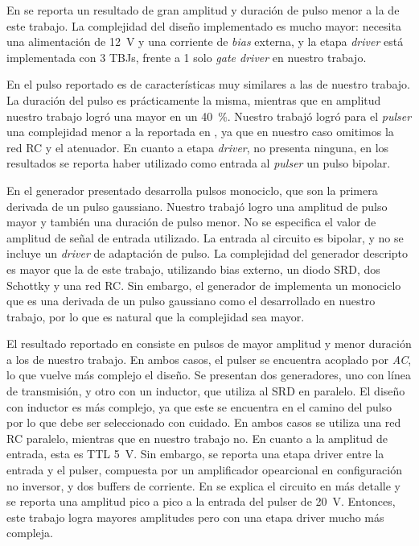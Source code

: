 En \cite{protiva2009} se reporta un resultado de gran amplitud y duración de
pulso menor a la de este trabajo. La complejidad del diseño implementado es
mucho mayor: necesita una alimentación de \qty{12}{\volt} y
una corriente de \textit{bias} externa, y la etapa \textit{driver} está
implementada con 3 TBJs, frente a 1 solo \textit{gate driver} en nuestro
trabajo.

En \cite{kamal2014} el pulso reportado es de características muy similares a las
de nuestro trabajo.  La duración del pulso es prácticamente la misma, mientras
que en amplitud nuestro trabajo logró una mayor en un \qty{40}{\percent}.
Nuestro trabajó logró para el \textit{pulser} una complejidad menor a la
reportada en \cite{kamal2014}, ya que en nuestro caso omitimos la red RC y el
atenuador. En cuanto a etapa \textit{driver}, \cite{kamal2014} no presenta
ninguna, en los resultados se reporta haber utilizado como entrada al
\textit{pulser} un pulso bipolar.

En \cite{han2002} el generador presentado desarrolla pulsos monociclo, que son
la primera derivada de un pulso gaussiano. Nuestro trabajó logro una amplitud de
pulso mayor y también una duración de pulso menor. No se especifica el valor de
amplitud de señal de entrada utilizado. La entrada al circuito es bipolar, y no
se incluye un \textit{driver} de adaptación de pulso. La complejidad del
generador descripto es mayor que la de este trabajo, utilizando bias externo, un
diodo SRD, dos Schottky y una red RC. Sin embargo, el generador de
\cite{han2002} implementa un monociclo que es una derivada de un pulso gaussiano
como el desarrollado en nuestro trabajo, por lo que es natural que la
complejidad sea mayor.

El resultado reportado en \cite{han2005} consiste en pulsos de mayor amplitud y
menor duración a los de nuestro trabajo. En ambos casos, el pulser se encuentra
acoplado por \textit{AC}, lo que vuelve más complejo el diseño.  Se presentan
dos generadores, uno con línea de transmisión, y otro con un inductor, que
utiliza al SRD en paralelo. El diseño con inductor es más complejo, ya que este
se encuentra en el camino del pulso por lo que debe ser seleccionado con
cuidado. En ambos casos se utiliza una red RC paralelo, mientras que en nuestro
trabajo no. En cuanto a la amplitud de entrada, esta es TTL \qty{5}{\volt}. Sin
embargo, se reporta una etapa driver entre la entrada y el pulser, compuesta por
un amplificador opearcional en configuración no inversor, y dos buffers de
corriente. En \cite{NguyenHan2014} se explica el circuito en más detalle y se
reporta una amplitud pico a pico a la entrada del pulser de \qty{20}{\volt}.
Entonces, este trabajo logra mayores amplitudes pero con una etapa driver mucho
más compleja.

